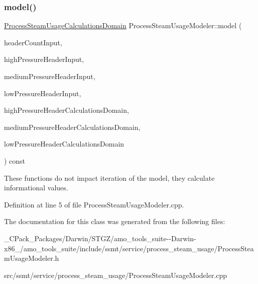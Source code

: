 \subsubsection{\texorpdfstring{model()}{model()}}
{\footnotesize\ttfamily \hyperlink{class_process_steam_usage_calculations_domain}{Process\+Steam\+Usage\+Calculations\+Domain} Process\+Steam\+Usage\+Modeler\+::model (\begin{DoxyParamCaption}\item[{const double}]{header\+Count\+Input,  }\item[{const \hyperlink{class_header_with_highest_pressure}{Header\+With\+Highest\+Pressure} \&}]{high\+Pressure\+Header\+Input,  }\item[{const std\+::shared\+\_\+ptr$<$ \hyperlink{class_header_not_highest_pressure}{Header\+Not\+Highest\+Pressure} $>$ \&}]{medium\+Pressure\+Header\+Input,  }\item[{const std\+::shared\+\_\+ptr$<$ \hyperlink{class_header_not_highest_pressure}{Header\+Not\+Highest\+Pressure} $>$ \&}]{low\+Pressure\+Header\+Input,  }\item[{const \hyperlink{class_high_pressure_header_calculations_domain}{High\+Pressure\+Header\+Calculations\+Domain} \&}]{high\+Pressure\+Header\+Calculations\+Domain,  }\item[{const std\+::shared\+\_\+ptr$<$ \hyperlink{class_medium_pressure_header_calculations_domain}{Medium\+Pressure\+Header\+Calculations\+Domain} $>$ \&}]{medium\+Pressure\+Header\+Calculations\+Domain,  }\item[{const std\+::shared\+\_\+ptr$<$ \hyperlink{class_low_pressure_header_calculations_domain}{Low\+Pressure\+Header\+Calculations\+Domain} $>$ \&}]{low\+Pressure\+Header\+Calculations\+Domain }\end{DoxyParamCaption}) const}

These functions do not impact iteration of the model, they calculate informational values. 

Definition at line 5 of file Process\+Steam\+Usage\+Modeler.\+cpp.



The documentation for this class was generated from the following files\+:\begin{DoxyCompactItemize}
\item 
\+\_\+\+C\+Pack\+\_\+\+Packages/\+Darwin/\+S\+T\+G\+Z/amo\+\_\+tools\+\_\+suite-\/-\/\+Darwin-\/x86\+\_/amo\+\_\+tools\+\_\+suite/include/ssmt/service/process\+\_\+steam\+\_\+usage/Process\+Steam\+Usage\+Modeler.\+h\item 
src/ssmt/service/process\+\_\+steam\+\_\+usage/Process\+Steam\+Usage\+Modeler.\+cpp\end{DoxyCompactItemize}

